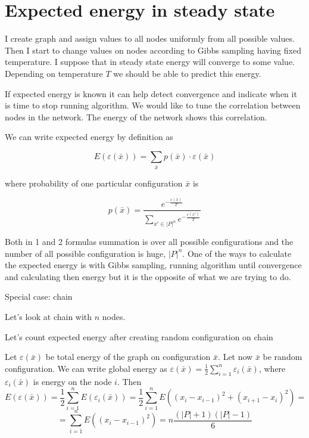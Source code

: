 \documentclass[12pt]{report}
\begin{document}
\section{Expected energy in steady state}

I create graph and assign values to all nodes uniformly from all possible values. Then I start to change values on nodes according to Gibbs sampling having fixed temperature. I suppose that in steady state energy will converge to some value. Depending on temperature $T$ we should be able to predict this energy.

If expected energy is known it can help detect convergence and indicate when it is time to stop running algorithm. We would like to tune the correlation between nodes in the network. The energy of the network shows this correlation.

We can write expected energy by definition as

$$ E(\varepsilon (\bar{x})) = \sum\limits_{\bar{x}} p(\bar{x}) \cdot \varepsilon(\bar{x})$$

where probability of one particular configuration $\bar{x}$ is  

$$ p(\bar{x}) = \frac{ e^{-\frac{ \varepsilon (x)}{T}} }{ \sum\limits_{x'\in |P|^n} e^{-\frac{\varepsilon(x')}{T}}} $$

Both in 1 and 2 formulas summation is over all possible configurations and the number of all possible configuration is huge, $|P|^n$. One of the ways to calculate the expected energy is with Gibbs sampling, running algorithm until convergence and calculating then energy but it is the opposite of what we are trying to do.



Special case: chain

Let's look at chain with $n$ nodes.

Let's count expected energy after creating random configuration on chain

Let $ \varepsilon (\bar{x})$ be total energy of the graph on configuration $\bar{x}$. Let now $\bar{x}$ be random configuration. We can write global energy as 
$\varepsilon (\bar{x}) = \frac{1}{2} \sum\limits_{i = 1}^{n} \varepsilon_i(\bar{x})$, where $\varepsilon_i(\bar{x})$ is energy on the node $i$. 
Then
$$E(\varepsilon (\bar{x})) = \frac{1}{2} \sum\limits_{i = 1}^{n} E(\varepsilon_i(\bar{x})) = 
\frac{1}{2} \sum\limits_{i = 1}^{n} E\left( (x_i - x_{i-1})^2 + (x_{i+1} - x_i)^2 \right) =
$$
$$ = \sum\limits_{i = 1}^{n} E\left( (x_i - x_{i-1})^2 \right) =
  n\frac{(|P|+1)(|P|-1)}{6}$$
\end{document}
